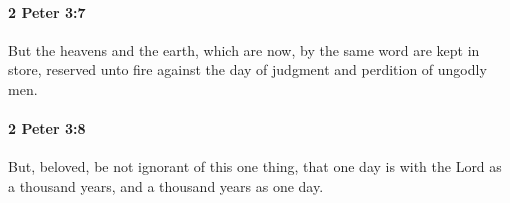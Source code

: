 		\paragraph{2 Peter 3:7} %
			\label{2PETER-3-7}

			But the heavens and the earth, which are now, by the same word are kept in store, reserved unto fire against the day of judgment and perdition of ungodly men.

			\begin{framed}
			\scriptsize
				\begin{compactdesc}
					\item[SBLG] 
				\end{compactdesc}
			\end{framed}

		\paragraph{2 Peter 3:8} %
			\label{2PETER-3-8}

			But, beloved, be not ignorant of this one thing, that one day is with the Lord as a thousand years, and a thousand years as one day.

